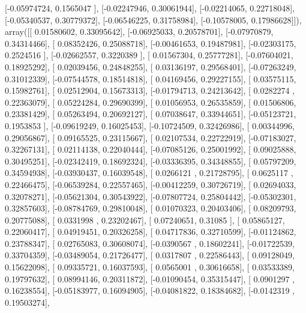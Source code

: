 \documentclass{article}
\begin{document}
       [-0.05974724,  0.1565047 ],
       [-0.02247946,  0.30061944],
       [-0.02214065,  0.22718048],
       [-0.05340537,  0.30779372],
       [-0.06546225,  0.31758984],
       [-0.10578005,  0.17986628]]), array([[ 0.01580602,  0.33095642],
       [-0.06925033,  0.20578701],
       [-0.07970879,  0.34314466],
       [ 0.08352426,  0.25088718],
       [-0.00461653,  0.19487981],
       [-0.02303175,  0.2524516 ],
       [-0.02662557,  0.3220389 ],
       [ 0.01567304,  0.25777281],
       [-0.07604021,  0.18925292],
       [ 0.02039456,  0.24848255],
       [ 0.03136197,  0.29568401],
       [-0.07263249,  0.31012339],
       [-0.07544578,  0.18514818],
       [ 0.04169456,  0.29227155],
       [ 0.03575115,  0.15982761],
       [ 0.02512904,  0.15673313],
       [-0.01794713,  0.24213642],
       [ 0.0282274 ,  0.22363079],
       [ 0.05224284,  0.29690399],
       [ 0.01056953,  0.26535859],
       [ 0.01506806,  0.23381429],
       [ 0.05263494,  0.20692127],
       [ 0.07038647,  0.33944651],
       [-0.05123721,  0.1953853 ],
       [-0.09619249,  0.16025453],
       [-0.10724509,  0.32426986],
       [ 0.00344996,  0.29056867],
       [ 0.09165525,  0.23115667],
       [ 0.02107534,  0.22722919],
       [-0.07183027,  0.32267131],
       [ 0.02114138,  0.22040444],
       [-0.07085126,  0.25001992],
       [ 0.09025888,  0.30495251],
       [-0.02342419,  0.18692324],
       [-0.03336395,  0.34348855],
       [ 0.05797209,  0.34594938],
       [-0.03930437,  0.16039548],
       [ 0.0266121 ,  0.21728795],
       [ 0.0625117 ,  0.22466475],
       [-0.06539284,  0.22557465],
       [-0.00412259,  0.30726719],
       [ 0.02694033,  0.32078271],
       [-0.05621304,  0.30543922],
       [-0.07807724,  0.25804442],
       [-0.05302301,  0.32857603],
       [-0.08784769,  0.29810048],
       [ 0.01070323,  0.20403406],
       [ 0.08209793,  0.20775088],
       [ 0.0331998 ,  0.23202467],
       [ 0.07240651,  0.31085   ],
       [ 0.05865127,  0.22060417],
       [ 0.04919451,  0.20326258],
       [ 0.04717836,  0.32710599],
       [-0.01124862,  0.23788347],
       [ 0.02765083,  0.30608074],
       [-0.0390567 ,  0.18602241],
       [-0.01722539,  0.33704359],
       [-0.03489054,  0.21726477],
       [ 0.0317807 ,  0.22586443],
       [ 0.09128049,  0.15622098],
       [ 0.09335721,  0.16037593],
       [ 0.0565001 ,  0.30616658],
       [ 0.03533389,  0.19797632],
       [ 0.08994146,  0.20311872],
       [-0.01090454,  0.35315447],
       [ 0.0901297 ,  0.16238554],
       [-0.05183977,  0.16094905],
       [-0.04081822,  0.18384682],
       [-0.0142319 ,  0.19503274],
\end{document}
